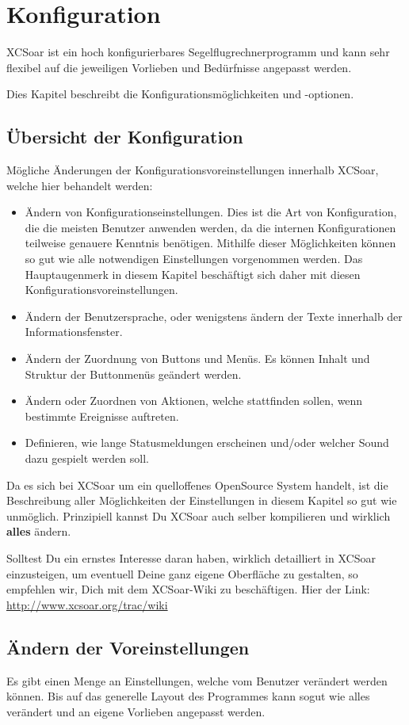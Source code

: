 \chapter{Konfiguration}\label{cha:configuration}
\textsf{XCSoar} ist ein hoch konfigurierbares Segelflugrechnerprogramm und kann sehr flexibel auf die jeweiligen Vorlieben
und Bedürfnisse angepasst werden.

Dies Kapitel beschreibt die Konfigurationsmöglichkeiten und  -optionen.
\section{Übersicht der Konfiguration}
Mögliche  Änderungen der Konfigurationsvoreinstellungen innerhalb \textsf{XCSoar}, welche hier behandelt werden:
\begin{itemize}
\item Ändern von  Konfigurationseinstellungen. Dies ist die Art von Konfiguration, die die meisten
    Benutzer anwenden werden, da die internen Konfigurationen teilweise genauere Kenntnis benötigen.
    Mithilfe dieser Möglichkeiten können so gut wie alle notwendigen  Einstellungen vorgenommen werden.
    Das Hauptaugenmerk in diesem Kapitel beschäftigt sich daher mit diesen Konfigurationsvoreinstellungen.
 \item Ändern der Benutzersprache, oder wenigstens ändern der Texte innerhalb der
     Informationsfenster.
\item Ändern der Zuordnung von Buttons und Menüs. Es können Inhalt und Struktur der Buttonmenüs
    geändert werden.
\item Ändern oder Zuordnen von Aktionen, welche stattfinden sollen, wenn bestimmte Ereignisse
    auftreten.
\item Definieren, wie lange Statusmeldungen erscheinen und/oder welcher Sound dazu gespielt werden
    soll.
\end{itemize}
Da es sich bei \textsf{XCSoar}  um ein quelloffenes OpenSource System handelt, ist die Beschreibung aller
Möglichkeiten der Einstellungen in diesem Kapitel so gut wie unmöglich. Prinzipiell kannst Du \textsf{XCSoar} auch
selber kompilieren und wirklich \textbf{alles} ändern.

Solltest Du ein ernstes Interesse daran haben, wirklich detailliert in \textsf{XCSoar}  einzusteigen, um eventuell Deine
ganz eigene Oberfläche zu gestalten, so empfehlen wir,  Dich mit dem \textsf{XCSoar}-Wiki  zu beschäftigen. Hier der
Link: \url{http://www.xcsoar.org/trac/wiki}
\section{Ändern der Voreinstellungen}
Es gibt einen Menge an Einstellungen, welche vom Benutzer verändert werden
können. Bis auf das generelle Layout des Programmes kann
 sogut wie alles verändert und
an eigene Vorlieben angepasst werden.

